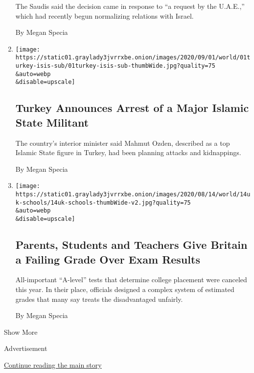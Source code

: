 \begin{enumerate}
  The Saudis said the decision came in response to ``a request by the
  U.A.E.,'' which had recently begun normalizing relations with Israel.

  By Megan Specia
\item
  \href{/2020/09/01/world/middleeast/turkey-islamic-state-arrest.html}{}

  \texttt{[image: https://static01.graylady3jvrrxbe.onion/images/2020/09/01/world/01turkey-isis-sub/01turkey-isis-sub-thumbWide.jpg?quality=75\\\&auto=webp\\\&disable=upscale]}

  \hypertarget{turkey-announces-arrest-of-a-major-islamic-state-militant}{%
  \subsection{Turkey Announces Arrest of a Major Islamic State
  Militant}\label{turkey-announces-arrest-of-a-major-islamic-state-militant}}

  The country's interior minister said Mahmut Ozden, described as a top
  Islamic State figure in Turkey, had been planning attacks and
  kidnappings.

  By Megan Specia
\item
  \href{/2020/08/14/world/europe/england-a-level-results.html}{}

  \texttt{[image: https://static01.graylady3jvrrxbe.onion/images/2020/08/14/world/14uk-schools/14uk-schools-thumbWide-v2.jpg?quality=75\\\&auto=webp\\\&disable=upscale]}

  \hypertarget{parents-students-and-teachers-give-britain-a-failing-grade-over-exam-results}{%
  \subsection{Parents, Students and Teachers Give Britain a Failing
  Grade Over Exam
  Results}\label{parents-students-and-teachers-give-britain-a-failing-grade-over-exam-results}}

  All-important ``A-level'' tests that determine college placement were
  canceled this year. In their place, officials designed a complex
  system of estimated grades that many say treats the disadvantaged
  unfairly.

  By Megan Specia
\end{enumerate}

Show More

Advertisement

\protect\hyperlink{after-mid2}{Continue reading the main story}

